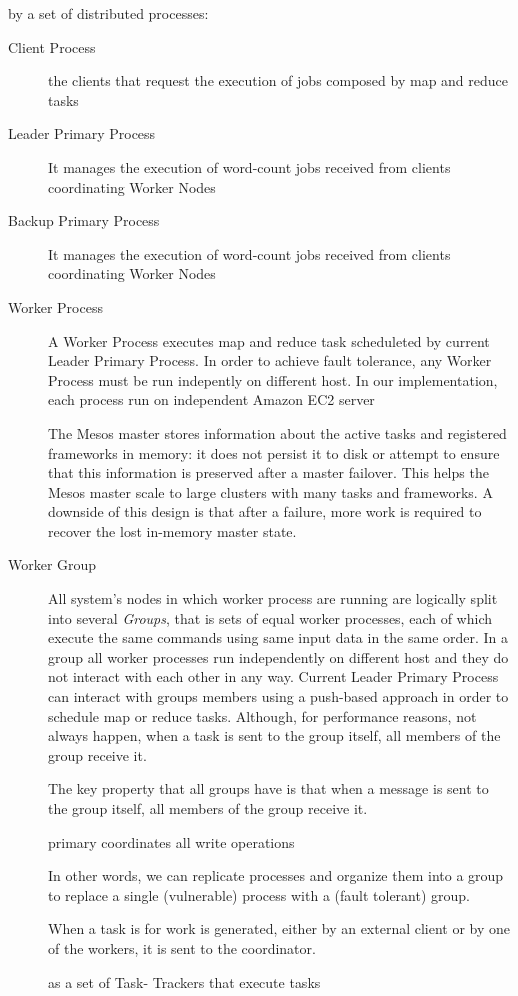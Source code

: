 \documentclass[sigchi]{acmart}
\begin{document}
 by a set of distributed processes:

\begin{description}
\item[Client Process] the clients that request the execution of jobs composed by map and reduce tasks

\item[Leader Primary Process] It manages the execution of word-count jobs received from clients coordinating Worker Nodes 

\item[Backup Primary Process] It manages the execution of word-count jobs received from clients coordinating Worker Nodes 

\item[Worker Process] A Worker Process executes map and reduce task scheduleted by current Leader Primary Process. In order to achieve fault tolerance, any Worker Process must be run indepently on different host. In our implementation, each process run on independent Amazon EC2 server

The Mesos master stores information about the active tasks and registered frameworks in memory: it does not persist it to disk or attempt to ensure that this information is preserved after a master failover. This helps the Mesos master scale to large clusters with many tasks and frameworks. A downside of this design is that after a failure, more work is required to recover the lost in-memory master state.



\item[Worker Group] All system's nodes in which worker process are running are logically split into several \textit{Groups}, that is sets of equal worker processes, each of which execute the same commands using same input data in the same order. In a group all worker processes run independently on different host and they do not interact with each other in any way. Current Leader Primary Process can interact with groups members using a push-based approach in order to schedule map or reduce tasks. Although, for performance reasons, not always happen, when a task is sent to the group itself, all members of the group receive it.



The key property that all groups have is that when a
message is sent to the group itself, all members of the group receive it.


 primary coordinates all write
operations


 In other words, we can replicate processes and organize them into a group to replace a single (vulnerable) process with a (fault tolerant) group.



 When a task is  for work is generated, either
by an external client or by one of the workers, it is sent to the coordinator.





as  a set of Task- Trackers that execute tasks
\end{description}
\end{document}
